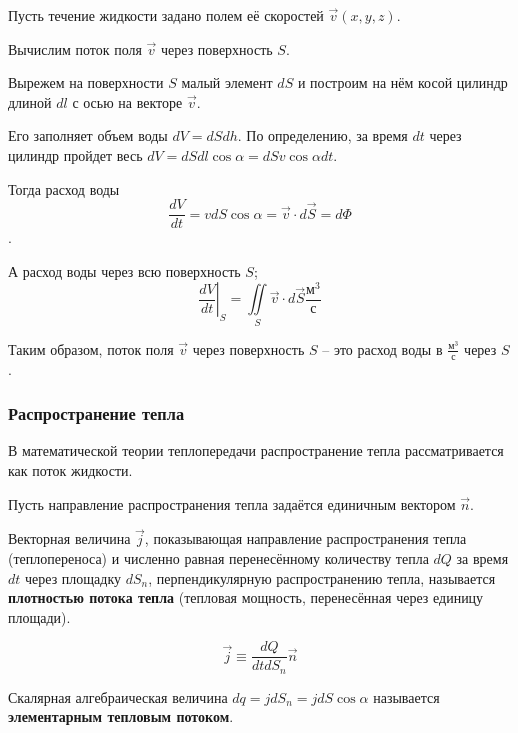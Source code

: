 	Пусть течение жидкости задано полем её скоростей \( \vec{v}(x, y, z) \).
	
	Вычислим поток поля \( \vec{v} \) через поверхность \( S \).
	
	Вырежем на поверхности \( S \) малый элемент \( dS \) и построим на нём косой цилиндр длиной \( dl \) с осью на векторе \( \vec{v} \).
	
	Его заполняет объем воды \( dV = dSdh \). По определению, за время \( dt \) через цилиндр пройдет весь \( dV = dSdl\cos\alpha = dSv\cos\alpha dt \).
	
	Тогда расход воды
	\[ \frac{dV}{dt} = vdS\cos\alpha = \vec{v}\cdot d\vec{S} = d\Phi \].
	
	А расход воды через всю поверхность \( S \);
	\[ \left. \frac{dV}{dt}\right|_S = \iint\limits_S \vec{v}\cdot d\vec{S} \frac{\text{м}^3}{\text{с}} \]
	
	Таким образом, поток поля \( \vec{v} \) через поверхность \( S \) -- это расход воды в \( \frac{\text{м}^3}{\text{с}} \) через \( S \).
	
\subsubsection{Распространение тепла}

	В математической теории теплопередачи распространение тепла рассматривается как поток жидкости.
	
	Пусть направление распространения тепла задаётся единичным вектором \( \vec{n} \).
	

	\begin{definition}
	Векторная величина \( \vec{j} \), показывающая направление распространения тепла (теплопереноса) и численно равная перенесённому количеству тепла \( dQ \) за время \( dt \) через площадку \( dS_n \), перпендикулярную распространению тепла, называется \textbf{плотностью потока тепла} (тепловая мощность, перенесённая через единицу площади).
	
	\begin{equation}
		\vec{j} \equiv \frac{dQ}{dtdS_n}\vec{n}
	\end{equation}
	\end{definition}
	
	\begin{definition}
	Скалярная алгебраическая величина \( dq = jdS_n = jdS\cos\alpha \) называется \textbf{элементарным тепловым потоком}.
	\end{definition}
	
